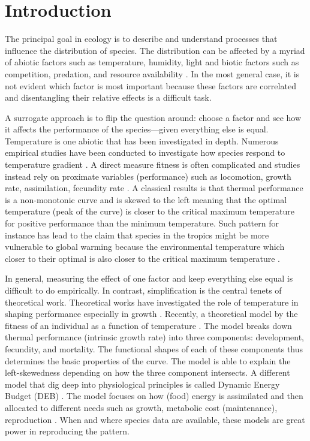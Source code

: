 \section*{Introduction}
The principal goal in ecology is to describe and understand processes that influence the distribution of species.
The distribution can be affected by a myriad of abiotic factors such as temperature, humidity, light  and  biotic factors such as competition, predation, and resource availability \citep{Krebs2000}.
In the most general case, it is not evident which factor is most important because these factors are correlated and disentangling their relative effects is a difficult task.

A surrogate approach is to flip the question around: choose a factor and see how it affects the performance of the species---given everything else is equal.
Temperature is one abiotic that has been investigated in depth.
Numerous empirical studies have been conducted to investigate how species respond to temperature gradient \citep[e.g.,][]{Angilletta2009}.
A direct measure fitness is often complicated and studies instead rely on proximate variables (performance) such as locomotion, growth rate, assimilation, fecundity rate \citep[][and reference therein]{Angilletta2009}.
A classical results is that thermal performance is a non-monotonic curve and is skewed to the left meaning that the optimal temperature (peak of the curve) is closer to the critical maximum temperature for positive performance than the minimum temperature. 
Such pattern for instance has lead to the claim that species in the tropics might be more vulnerable to global warming because the environmental temperature which closer to their optimal  is also  closer to the critical maximum temperature \citep{Deutsch2008}.

In general, measuring the effect of one factor and keep everything else equal  is difficult to do empirically.
In contrast, simplification is the central tenets of theoretical work.
Theoretical works have investigated the role of temperature in shaping performance especially in growth \citep{VandH1996, Kozlowski2004}.
Recently, a theoretical model by \citet{Amarasekare2012} the fitness of an individual as a function of temperature \citep{Amarasekare2012}.
The model  breaks down thermal performance (intrinsic growth rate)  into three components: development, fecundity, and mortality.
The functional shapes of each of these components thus determines the basic properties of the curve.
The model is able to explain the left-skewedness depending on how the three component intersects.
A different model that dig deep into physiological principles is called Dynamic Energy Budget (DEB) \citep{Kooijman2009}.
The model focuses on how (food) energy is assimilated and then allocated to different needs such as growth, metabolic cost (maintenance), reproduction \citep{Kooijman2009}.
When and where species data are available, these models are great power in reproducing the pattern. 

